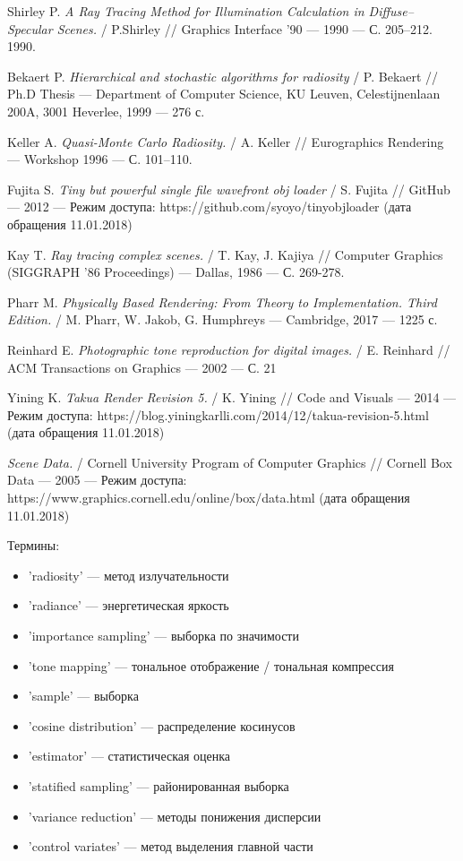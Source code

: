 \documentclass[12pt]{article}
\begin{document}
\begin{thebibliography}{9}
Shirley P.
\textit{A Ray Tracing Method for Illumination Calculation in Diffuse–Specular Scenes.} /
P.Shirley //
Graphics Interface '90 --- 1990 --- С. 205–212.
1990.

Bekaert P.
\textit{Hierarchical and stochastic algorithms for radiosity} /
P. Bekaert //
Ph.D Thesis --- Department of Computer Science, KU Leuven, Celestijnenlaan 200A, 3001 Heverlee, 1999 --- 276 с.

Keller  A.
\textit{Quasi-Monte Carlo Radiosity.} /
A. Keller //
Eurographics Rendering --- Workshop 1996 --- С. 101–110.

Fujita S.
\textit{Tiny but powerful single file wavefront obj loader} /
S. Fujita //
GitHub --- 2012 --- Режим доступа: https://github.com/syoyo/tinyobjloader (дата обращения 11.01.2018)

Kay T.
\textit{Ray tracing complex scenes.} /
T. Kay, J. Kajiya //
Computer Graphics (SIGGRAPH ’86 Proceedings) --- Dallas, 1986 --- С. 269-278.

Pharr M.
\textit{Physically Based Rendering: From Theory to Implementation. Third Edition.} /
M. Pharr, W. Jakob, G. Humphreys --- Cambridge, 2017 --- 1225 с.

Reinhard E.
\textit{Photographic tone reproduction for digital images.} /
E. Reinhard //
ACM Transactions on Graphics --- 2002 --- С. 21

Yining K.
\textit{Takua Render Revision 5.} / 
K. Yining //
Code and Visuals --- 2014 --- Режим доступа: https://blog.yiningkarlli.com/2014/12/takua-revision-5.html (дата обращения 11.01.2018)

\textit{Scene Data.} /
Cornell University Program of Computer Graphics //
Cornell Box Data --- 2005 --- Режим доступа: https://www.graphics.cornell.edu/online/box/data.html (дата обращения 11.01.2018)

\end{thebibliography}
\newpage
Термины:

\begin{itemize}
\item[] 'radiosity' --- метод излучательности
\item[] 'radiance' --- энергетическая яркость
\item[] 'importance sampling' --- выборка по значимости
\item[] 'tone mapping' --- тональное отображение / тональная компрессия
\item[] 'sample' --- выборка
\item[] 'cosine distribution' --- распределение косинусов
\item[] 'estimator' --- статистическая оценка
\item[] 'statified sampling' --- районированная выборка
\item[] 'variance reduction' --- методы понижения дисперсии
\item[] 'control variates' --- метод выделения главной части
\end{itemize}
\end{document}
